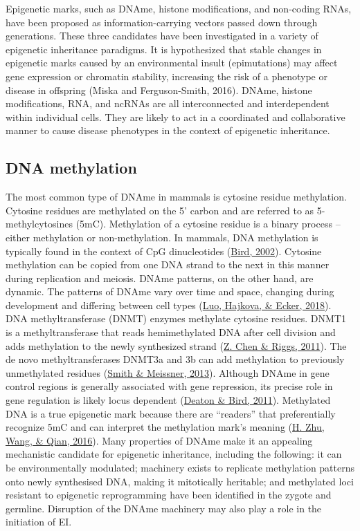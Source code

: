 \documentclass[12pt,twoside]{reedthesis}
\begin{document}
Epigenetic marks, such as DNAme, histone modifications, and non-coding
RNAs, have been proposed as information-carrying vectors passed down
through generations. These three candidates have been investigated in a
variety of epigenetic inheritance paradigms. It is hypothesized that stable changes in
epigenetic marks caused by an environmental insult (epimutations) may
affect gene expression or chromatin stability, increasing the risk of a
phenotype or disease in offspring (Miska and Ferguson-Smith, 2016).
DNAme, histone modifications, RNA, and ncRNAs are all interconnected and
interdependent within individual cells. They are likely to act in a
coordinated and collaborative manner to cause disease phenotypes in the
context of epigenetic inheritance.

\hypertarget{dna-methylation}{%
\subsection*{DNA methylation}\label{dna-methylation}}

The most common type of DNAme in mammals is cytosine residue
methylation. Cytosine residues are methylated on the 5' carbon and are
referred to as 5-methylcytosines (5mC). Methylation of a cytosine
residue is a binary process -- either methylation or non-methylation. In
mammals, DNA methylation is typically found in the context of CpG
dinucleotides (\protect\hyperlink{ref-bird2002}{Bird, 2002}). Cytosine methylation can be copied from one
DNA strand to the next in this manner during replication and meiosis.
DNAme patterns, on the other hand, are dynamic. The patterns of DNAme
vary over time and space, changing during development and differing
between cell types (\protect\hyperlink{ref-luo2018}{Luo, Hajkova, \& Ecker, 2018}). DNA methyltransferase (DNMT) enzymes
methylate cytosine residues. DNMT1 is a methyltransferase that reads
hemimethylated DNA after cell division and adds methylation to the newly
synthesized strand (\protect\hyperlink{ref-chen2011}{Z. Chen \& Riggs, 2011}). The de novo methyltransferases DNMT3a
and 3b can add methylation to previously unmethylated residues
(\protect\hyperlink{ref-smith2013}{Smith \& Meissner, 2013}). Although DNAme in gene control regions is generally
associated with gene repression, its precise role in gene regulation is
likely locus dependent (\protect\hyperlink{ref-deaton2011}{Deaton \& Bird, 2011}). Methylated DNA is a true
epigenetic mark because there are ``readers'' that preferentially
recognize 5mC and can interpret the methylation mark's meaning
(\protect\hyperlink{ref-zhu2016a}{H. Zhu, Wang, \& Qian, 2016}). Many properties of DNAme make it an appealing mechanistic
candidate for epigenetic inheritance, including the following: it can be
environmentally modulated; machinery exists to replicate methylation
patterns onto newly synthesised DNA, making it mitotically heritable;
and methylated loci resistant to epigenetic reprogramming have been
identified in the zygote and germline. Disruption of the DNAme machinery
may also play a role in the initiation of EI.
\end{document}

